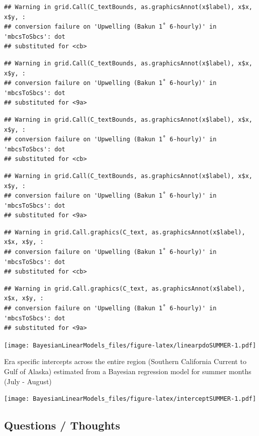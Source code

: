 \documentclass[
]{article}
\begin{document}
\begin{verbatim}
## Warning in grid.Call(C_textBounds, as.graphicsAnnot(x$label), x$x, x$y, :
## conversion failure on 'Upwelling (Bakun 1˚ 6-hourly)' in 'mbcsToSbcs': dot
## substituted for <cb>
\end{verbatim}

\begin{verbatim}
## Warning in grid.Call(C_textBounds, as.graphicsAnnot(x$label), x$x, x$y, :
## conversion failure on 'Upwelling (Bakun 1˚ 6-hourly)' in 'mbcsToSbcs': dot
## substituted for <9a>
\end{verbatim}

\begin{verbatim}
## Warning in grid.Call(C_textBounds, as.graphicsAnnot(x$label), x$x, x$y, :
## conversion failure on 'Upwelling (Bakun 1˚ 6-hourly)' in 'mbcsToSbcs': dot
## substituted for <cb>
\end{verbatim}

\begin{verbatim}
## Warning in grid.Call(C_textBounds, as.graphicsAnnot(x$label), x$x, x$y, :
## conversion failure on 'Upwelling (Bakun 1˚ 6-hourly)' in 'mbcsToSbcs': dot
## substituted for <9a>
\end{verbatim}

\begin{verbatim}
## Warning in grid.Call.graphics(C_text, as.graphicsAnnot(x$label), x$x, x$y, :
## conversion failure on 'Upwelling (Bakun 1˚ 6-hourly)' in 'mbcsToSbcs': dot
## substituted for <cb>
\end{verbatim}

\begin{verbatim}
## Warning in grid.Call.graphics(C_text, as.graphicsAnnot(x$label), x$x, x$y, :
## conversion failure on 'Upwelling (Bakun 1˚ 6-hourly)' in 'mbcsToSbcs': dot
## substituted for <9a>
\end{verbatim}

\texttt{[image: BayesianLinearModels\_files/figure-latex/linearpdoSUMMER-1.pdf]}

Era specific intercepts across the entire region (Southern California
Current to Gulf of Alaska) estimated from a Bayesian regression model
for summer months (July - August)

\texttt{[image: BayesianLinearModels\_files/figure-latex/interceptSUMMER-1.pdf]}

\hypertarget{questions-thoughts}{%
\subsection{Questions / Thoughts}\label{questions-thoughts}}
\end{document}
